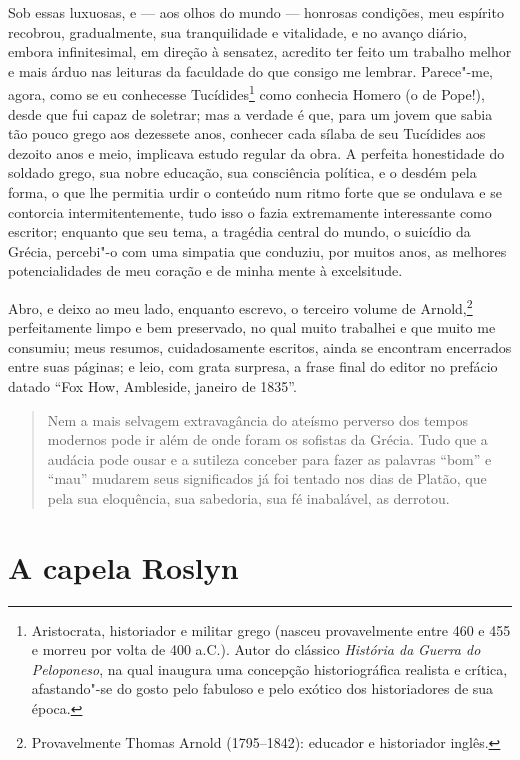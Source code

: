 Sob essas luxuosas, e --- aos olhos do mundo --- honrosas condições,
meu espírito recobrou, gradualmente, sua tranquilidade e vitalidade, e
no avanço diário, embora infinitesimal, em direção à sensatez, acredito
ter feito um trabalho melhor e mais árduo nas leituras da faculdade do
que consigo me lembrar. Parece"-me, agora, como se eu conhecesse
Tucídides\footnote{Aristocrata, historiador e militar grego (nasceu
  provavelmente entre 460 e 455 e morreu por volta de 400 a.C.). Autor
  do clássico \textit{História da} \textit{Guerra do Peloponeso}, na qual
  inaugura uma concepção historiográfica realista e crítica,
  afastando"-se do gosto pelo fabuloso e pelo exótico dos historiadores
  de sua época.} como conhecia Homero (o de Pope!), desde
que fui capaz de soletrar; mas a verdade é que, para um jovem que sabia
tão pouco grego aos dezessete anos, conhecer cada sílaba de seu
Tucídides aos dezoito anos e meio, implicava estudo regular da obra. A
perfeita honestidade do soldado grego, sua nobre educação, sua
consciência política, e o desdém pela forma, o que lhe permitia urdir o
conteúdo num ritmo forte que se ondulava e se contorcia
intermitentemente, tudo isso o fazia extremamente interessante como
escritor; enquanto que seu tema, a tragédia central do mundo, o suicídio
da Grécia, percebi"-o com uma simpatia que conduziu, por muitos anos, as
melhores potencialidades de meu coração e de minha mente à excelsitude.

Abro, e deixo ao meu lado, enquanto escrevo, o terceiro volume de
Arnold,\footnote{Provavelmente Thomas Arnold (1795--1842): educador e
  historiador inglês.} perfeitamente limpo e bem
preservado, no qual muito trabalhei e que muito me consumiu; meus
resumos, cuidadosamente escritos, ainda se encontram encerrados entre
suas páginas; e leio, com grata surpresa, a frase final do editor no
prefácio datado ``Fox How, Ambleside, janeiro de 1835''.

\begin{quote}
Nem a mais selvagem extravagância do ateísmo perverso dos tempos
modernos pode ir além de onde foram os sofistas da Grécia. Tudo que a
audácia pode ousar e a sutileza conceber para fazer as palavras ``bom''
e ``mau'' mudarem seus significados já foi tentado nos dias de Platão,
que pela sua eloquência, sua sabedoria, sua fé inabalável, as
derrotou.
\end{quote}

\chapter{A capela Roslyn} %

